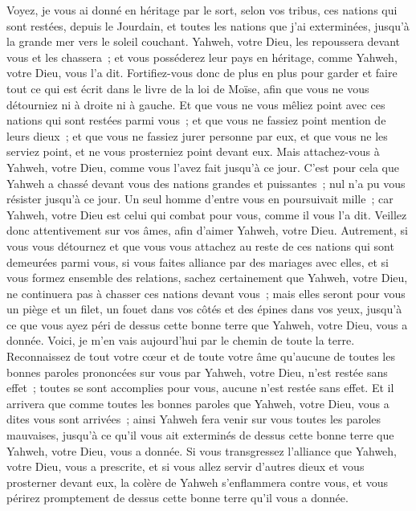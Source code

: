 \begin{multicols}{2}
Voyez, je vous ai donné en héritage par le sort, selon vos tribus, ces nations qui sont restées, depuis le Jourdain, et toutes les nations que j'ai exterminées, jusqu'à la grande mer vers le soleil couchant.
Yahweh, votre Dieu, les repoussera devant vous et les chassera~; et vous posséderez leur pays en héritage, comme Yahweh, votre Dieu, vous l'a dit.
Fortifiez-vous donc de plus en plus pour garder et faire tout ce qui est écrit dans le livre de la loi de Moïse, afin que vous ne vous détourniez ni à droite ni à gauche.
Et que vous ne vous mêliez point avec ces nations qui sont restées parmi vous~; et que vous ne fassiez point mention de leurs dieux~; et que vous ne fassiez jurer personne par eux, et que vous ne les serviez point, et ne vous prosterniez point devant eux.
Mais attachez-vous à Yahweh, votre Dieu, comme vous l'avez fait jusqu'à ce jour.
C'est pour cela que Yahweh a chassé devant vous des nations grandes et puissantes~; nul n'a pu vous résister jusqu'à ce jour.
Un seul homme d'entre vous en poursuivait mille~; car Yahweh, votre Dieu est celui qui combat pour vous, comme il vous l'a dit.
Veillez donc attentivement sur vos âmes, afin d'aimer Yahweh, votre Dieu.
Autrement, si vous vous détournez et que vous vous attachez au reste de ces nations qui sont demeurées parmi vous, si vous faites alliance par des mariages avec elles, et si vous formez ensemble des relations,
sachez certainement que Yahweh, votre Dieu, ne continuera pas à chasser ces nations devant vous~; mais elles seront pour vous un piège et un filet, un fouet dans vos côtés et des épines dans vos yeux, jusqu'à ce que vous ayez péri de dessus cette bonne terre que Yahweh, votre Dieu, vous a donnée.
Voici, je m'en vais aujourd'hui par le chemin de toute la terre. Reconnaissez de tout votre cœur et de toute votre âme qu'aucune de toutes les bonnes paroles prononcées sur vous par Yahweh, votre Dieu, n'est restée sans effet~; toutes se sont accomplies pour vous, aucune n'est restée sans effet.
Et il arrivera que comme toutes les bonnes paroles que Yahweh, votre Dieu, vous a dites vous sont arrivées~; ainsi Yahweh fera venir sur vous toutes les paroles mauvaises, jusqu'à ce qu'il vous ait exterminés de dessus cette bonne terre que Yahweh, votre Dieu, vous a donnée.
Si vous transgressez l'alliance que Yahweh, votre Dieu, vous a prescrite, et si vous allez servir d'autres dieux et vous prosterner devant eux, la colère de Yahweh s'enflammera contre vous, et vous périrez promptement de dessus cette bonne terre qu'il vous a donnée.

\end{multicols}
